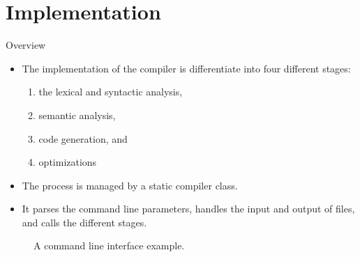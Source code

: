 \section{Implementation}
\begin{frame}{Overview}
    \begin{itemize}
        \item The implementation of the compiler is differentiate into four different stages:
        \begin{enumerate}
            \item the lexical and syntactic analysis,
            \item semantic analysis,
            \item code generation, and %
            \item optimizations
        \end{enumerate}
        \item The process is managed by a static compiler class.
        \item It parses the command line parameters, handles the input and output of files, and calls the different stages.
    \end{itemize}    
    \begin{figure}[htp]
        \centering     
        
        \caption{A command line interface example.}
    \end{figure}
\end{frame}

